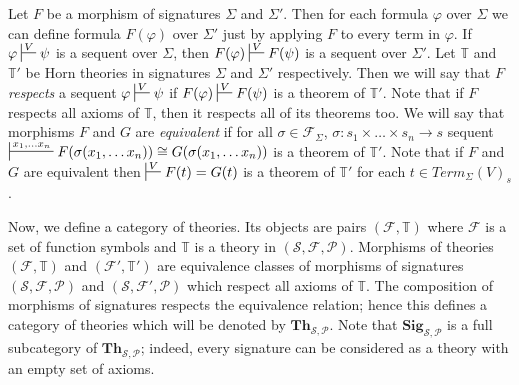 \documentclass{amsart}
\theoremstyle{definition}
\theoremstyle{remark}
\newcommand{\cat}[1]{\mathbf{#1}}
\newcommand{\Sig}{\cat{Sig}}
\newcommand{\Th}{\cat{Th}}
\numberwithin{figure}{section}
\begin{document}
Let $F$ be a morphism of signatures $\Sigma$ and $\Sigma'$.
Then for each formula $\varphi$ over $\Sigma$ we can define formula $F(\varphi)$ over $\Sigma'$ just by applying $F$ to every term in $\varphi$.
If $\varphi \sststile{}{V} \psi$ is a sequent over $\Sigma$, then $F(\varphi) \sststile{}{V} F(\psi)$ is a sequent over $\Sigma'$.
Let $\mathbb{T}$ and $\mathbb{T}'$ be Horn theories in signatures $\Sigma$ and $\Sigma'$ respectively.
Then we will say that $F$ \emph{respects} a sequent $\varphi \sststile{}{V} \psi$ if $F(\varphi) \sststile{}{V} F(\psi)$ is a theorem of $\mathbb{T}'$.
Note that if $F$ respects all axioms of $\mathbb{T}$, then it respects all of its theorems too.
We will say that morphisms $F$ and $G$ are \emph{equivalent} if for all $\sigma \in \mathcal{F}_\Sigma$, $\sigma : s_1 \times \ldots \times s_n \to s$ sequent $\sststile{}{x_1, \ldots x_n} F(\sigma(x_1, \ldots x_n)) \cong G(\sigma(x_1, \ldots x_n))$ is a theorem of $\mathbb{T}'$.
Note that if $F$ and $G$ are equivalent then $\sststile{}{V} F(t) = G(t)$ is a theorem of $\mathbb{T}'$ for each $t \in Term_\Sigma(V)_s$.

Now, we define a category of theories.
Its objects are pairs $(\mathcal{F},\mathbb{T})$ where $\mathcal{F}$ is a set of function symbols and $\mathbb{T}$ is a theory in $(\mathcal{S},\mathcal{F},\mathcal{P})$.
Morphisms of theories $(\mathcal{F},\mathbb{T})$ and $(\mathcal{F}',\mathbb{T}')$ are equivalence classes of morphisms of signatures $(\mathcal{S},\mathcal{F},\mathcal{P})$ and $(\mathcal{S},\mathcal{F}',\mathcal{P})$ which respect all axioms of $\mathbb{T}$.
The composition of morphisms of signatures respects the equivalence relation; hence this defines a category of theories which will be denoted by $\Th_{\mathcal{S},\mathcal{P}}$.
Note that $\Sig_{\mathcal{S},\mathcal{P}}$ is a full subcategory of $\Th_{\mathcal{S},\mathcal{P}}$; indeed, every signature can be considered as a theory with an empty set of axioms.
\end{document}
